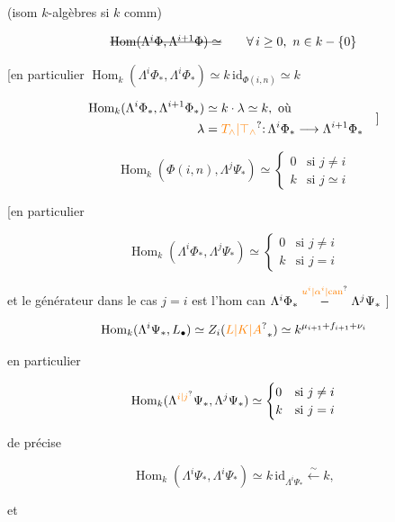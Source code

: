 (isom   $k$-algèbres si $k$ comm)

\[
\deleted{\operatorname{Hom}(\Lambda^{i}\Phi,\Lambda^{i+1}\Phi)\simeq}\qquad \forall\,i\geq0,\ n\in k-\{0\}
\]

[en particulier $\operatorname{Hom}_k(\Lambda^i\Phi_{\ast},\Lambda^i\Phi_{\ast})\simeq k\,\mathrm{id}_{\Phi(i,n)}\simeq k$ \unsure{]} 

\[
\begin{aligned}
\operatorname{Hom}_k(\Lambda^i\Phi_{\ast},\Lambda^{i+1}\Phi_{\ast})&\simeq k\cdot\lambda\simeq k,\ \text{où}\\
\lambda&=\unsure{T_{\wedge}|\top_{\wedge}}\mathpunct{:}\Lambda^i\Phi_{\ast}\longrightarrow\Lambda^{i+1}\Phi_{\ast}
\end{aligned}\quad\text{]}
\]

\[
\operatorname{Hom}_k(\Phi(i,n),\Lambda^j\Psi_{\ast})\simeq
\begin{cases}0&\text{si }j\ne i\\k&\text{si }j\simeq i\end{cases}
\]

[en particulier

\[
\operatorname{Hom}_k(\Lambda^i\Phi_{\ast},\Lambda^j\Psi_{\ast})\simeq
\begin{cases}0&\text{si }j\ne i\\k&\text{si }j=i\end{cases}
\]

et le générateur dans le cas $j=i$ est l'hom can $\Lambda^i\Phi_{\ast}\mathrel{\overset{\unsure{u^i|\alpha^i|\mathrm{can}}}{-}}\Lambda^j\Psi_{\ast}$ ]

\[
\operatorname{Hom}_k(\Lambda^i\Psi_{\ast},L_{\bullet})\simeq Z_i(\unsure{L|K|A}_{\ast})\simeq k^{\mu_{i+1}+f_{i+1}+\nu_i}
\]

en particulier


\[
\operatorname{Hom}_k(\Lambda^{\unsure{i|j}}\Psi_{\ast},\Lambda^j\Psi_{\ast})\simeq
\begin{cases}0&\text{si }j\ne i\\k&\text{si }j=i\end{cases}
\]

de  précise

\[
\operatorname{Hom}_k(\Lambda^i\Psi_{\ast},\Lambda^i\Psi_{\ast})\simeq k\,\mathrm{id}_{\Lambda^i\Psi_{\ast}}\xleftarrow{\sim} k,
\]

et

